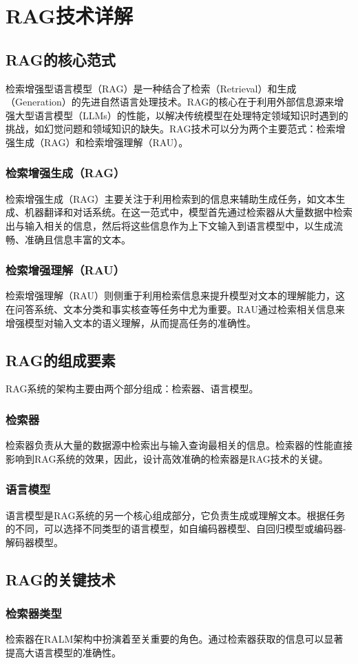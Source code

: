 \chapter{RAG技术详解}
\section{RAG的核心范式}
检索增强型语言模型（RAG）是一种结合了检索（Retrieval）和生成（Generation）的先进自然语言处理技术。RAG的核心在于利用外部信息源来增强大型语言模型（LLMs）的性能，以解决传统模型在处理特定领域知识时遇到的挑战，如幻觉问题和领域知识的缺失。RAG技术可以分为两个主要范式：检索增强生成（RAG）和检索增强理解（RAU）。
\subsection{检索增强生成（RAG）}
检索增强生成（RAG）主要关注于利用检索到的信息来辅助生成任务，如文本生成、机器翻译和对话系统。在这一范式中，模型首先通过检索器从大量数据中检索出与输入相关的信息，然后将这些信息作为上下文输入到语言模型中，以生成流畅、准确且信息丰富的文本。
\subsection{检索增强理解（RAU）}
检索增强理解（RAU）则侧重于利用检索信息来提升模型对文本的理解能力，这在问答系统\cite{Ahn2022}、文本分类和事实核查等任务中尤为重要。RAU通过检索相关信息来增强模型对输入文本的语义理解，从而提高任务的准确性。
\section{RAG的组成要素}
RAG系统的架构主要由两个部分组成：检索器、语言模型。
\subsection{检索器}
检索器负责从大量的数据源中检索出与输入查询最相关的信息。检索器的性能直接影响到RAG系统的效果，因此，设计高效准确的检索器是RAG技术的关键。
\subsection{语言模型}
语言模型是RAG系统的另一个核心组成部分，它负责生成或理解文本。根据任务的不同，可以选择不同类型的语言模型，如自编码器模型、自回归模型或编码器-解码器模型。
\section{RAG的关键技术}
\subsection{检索器类型}
检索器在RALM架构中扮演着至关重要的角色。通过检索器获取的信息可以显著提高大语言模型的准确性。

